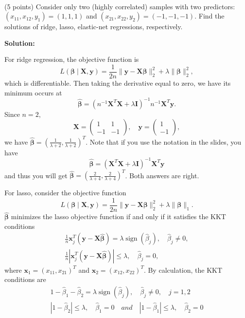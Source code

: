 \documentclass[a4 paper]{article}
\numberwithin{equation}{section}
\newcommand{\problem}[2]{~\\\fbox{\textbf{Problem #1}}\hfill (#2 points)\newline\newline}
\newcommand{\0}{\mathbf{0}}
\begin{document}
	\bigskip
	
	
	
	\problem{2}{5}
		Consider only two (highly correlated) samples with two predictors: $\left(x_{11}, x_{12}, y_1\right)=(1,1,1)$ and $\left(x_{21}, x_{22}, y_2\right)=(-1,-1,-1)$. Find the solutions of ridge, lasso, elastic-net regressions, respectively.
	
		\bigskip
	\noindent\textbf{Solution:}	
	
	For ridge regression, the objective function is
	$$
	L(\boldsymbol{\beta} \mid \mathbf{X}, \mathbf{y})=\frac{1}{2 n}\|\mathbf{y}-\mathbf{X} \boldsymbol{\beta}\|_2^2+\lambda\|\boldsymbol{\beta}\|_2^2,
	$$
	which is differentiable. Then taking the derivative equal to zero, we have its minimum occurs at
	$$
	\widehat{\boldsymbol{\beta}}=\left(n^{-1} \mathbf{X}^T \mathbf{X}+\lambda \mathbf{I}\right)^{-1} n^{-1} \mathbf{X}^T \mathbf{y}.
	$$
	Since $n=2$,
	$$
	\mathbf{X}=\left(\begin{array}{ll}
		1& 1\\
		-1& -1
	\end{array}\right), \quad
	\mathbf{y}=\left(\begin{array}{ll}
		1\\
		-1
	\end{array}\right),
	$$
	we have
	$\widehat{\boldsymbol{\beta}}=(\frac{1}{\lambda+2}, \frac{1}{\lambda+2})^T$.  Note that if you use the notation in the slides, you have
	$$
	\widehat{\boldsymbol{\beta}}=\left( \mathbf{X}^T \mathbf{X}+\lambda \mathbf{I}\right)^{-1}  \mathbf{X}^T \mathbf{y} 
	$$
	and thus you will get $\widehat{\boldsymbol{\beta}}=(\frac{2}{\lambda+4}, \frac{2}{\lambda+4})^T$. Both answers are right.
	\bigskip
	
 For lasso, consider the objective function
	$$
	L(\boldsymbol{\beta} \mid \mathbf{X}, \mathbf{y})=\frac{1}{2 n}\|\mathbf{y}-\mathbf{X} \boldsymbol{\beta}\|_2^2+\lambda\|\boldsymbol{\beta}\|_1.
	$$
 $\widehat{\boldsymbol{\beta}}$ minimizes the lasso objective function if and only if it satisfies the KKT conditions
	$$
	\begin{aligned}
		& \frac{1}{n} \mathbf{x}_j^T(\mathbf{y}-\mathbf{X} \widehat{\boldsymbol{\beta}})=\lambda \operatorname{sign}\left(\widehat{\beta}_j\right), \quad \widehat{\beta}_j \neq 0, \\
		& \frac{1}{n}\left|\mathbf{x}_j^T(\mathbf{y}-\mathbf{X} \widehat{\boldsymbol{\beta}})\right| \leq \lambda, \quad \widehat{\beta}_j=0,
		&
	\end{aligned}
	$$
	where $\mathbf{x}_1=(x_{11}, x_{21})^T$ and $\mathbf{x}_2=(x_{12}, x_{22})^T$. By calculation, the KKT conditions are
	$$
	\begin{aligned}
		& 1-\widehat{\beta}_1 -\widehat{\beta}_2 =\lambda \operatorname{sign}\left(\widehat{\beta}_j\right), \quad \widehat{\beta}_j \neq 0, \quad j=1,2 \\
		& \left|1 - \widehat{\beta}_2 \right| \leq \lambda, \quad \widehat{\beta}_1=0 \quad and \quad \left|1 - \widehat{\beta}_1 \right| \leq \lambda, \quad \widehat{\beta}_2=0
		&
	\end{aligned}
	$$
	
\end{document}

